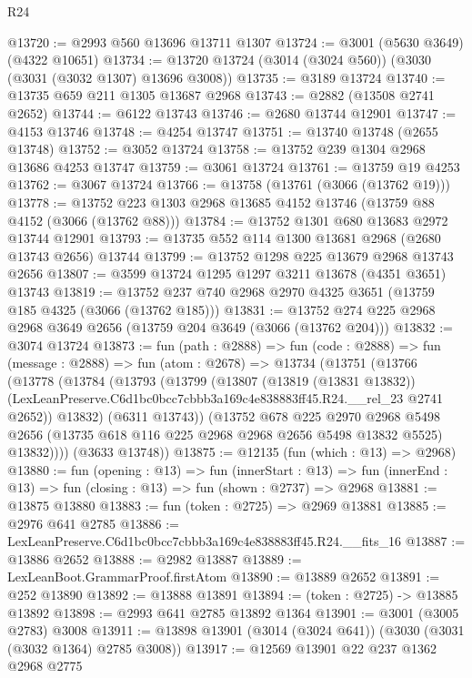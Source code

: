 \begin{lexlean}{R24}
\begin{coremodule}
@13720 := @2993 @560 @13696 @13711 @1307
@13724 := @3001 (@5630 @3649) (@4322 @10651)
@13734 := @13720 @13724 (@3014 (@3024 @560)) (@3030 (@3031 (@3032 @1307) @13696 @3008))
@13735 := @3189 @13724
@13740 := @13735 @659 @211 @1305 @13687 @2968
@13743 := @2882 (@13508 @2741 @2652)
@13744 := @6122 @13743
@13746 := @2680 @13744 @12901
@13747 := @4153 @13746
@13748 := @4254 @13747
@13751 := @13740 @13748 (@2655 @13748)
@13752 := @3052 @13724
@13758 := @13752 @239 @1304 @2968 @13686 @4253 @13747
@13759 := @3061 @13724
@13761 := @13759 @19 @4253
@13762 := @3067 @13724
@13766 := @13758 (@13761 (@3066 (@13762 @19)))
@13778 := @13752 @223 @1303 @2968 @13685 @4152 @13746 (@13759 @88 @4152 (@3066 (@13762 @88)))
@13784 := @13752 @1301 @680 @13683 @2972 @13744 @12901
@13793 := @13735 @552 @114 @1300 @13681 @2968 (@2680 @13743 @2656) @13744
@13799 := @13752 @1298 @225 @13679 @2968 @13743 @2656
@13807 := @3599 @13724 @1295 @1297 @3211 @13678 (@4351 @3651) @13743
@13819 := @13752 @237 @740 @2968 @2970 @4325 @3651 (@13759 @185 @4325 (@3066 (@13762 @185)))
@13831 := @13752 @274 @225 @2968 @2968 @3649 @2656 (@13759 @204 @3649 (@3066 (@13762 @204)))
@13832 := @3074 @13724
@13873 := fun (path : @2888) =>
  fun (code : @2888) =>
  fun (message : @2888) =>
  fun (atom : @2678) =>
  @13734
    (@13751
      (@13766
        (@13778
          (@13784
            (@13793
              (@13799
                (@13807
                  (@13819 (@13831 @13832))
                  (LexLeanPreserve.C6d1bc0bcc7cbbb3a169c4e838883ff45.R24.__rel_23 @2741 @2652))
                @13832)
              (@6311 @13743))
            (@13752
              @678
              @225
              @2970
              @2968
              @5498
              @2656
              (@13735 @618 @116 @225 @2968 @2968 @2656 @5498 @13832 @5525)
              @13832))))
      (@3633 @13748))
@13875 := @12135 (fun (which : @13) => @2968)
@13880 := fun (opening : @13) =>
  fun (innerStart : @13) =>
  fun (innerEnd : @13) => fun (closing : @13) => fun (shown : @2737) => @2968
@13881 := @13875 @13880
@13883 := fun (token : @2725) => @2969 @13881
@13885 := @2976 @641 @2785
@13886 := LexLeanPreserve.C6d1bc0bcc7cbbb3a169c4e838883ff45.R24.__fits_16
@13887 := @13886 @2652
@13888 := @2982 @13887
@13889 := LexLeanBoot.GrammarProof.firstAtom
@13890 := @13889 @2652
@13891 := @252 @13890
@13892 := @13888 @13891
@13894 := (token : @2725) -> @13885 @13892
@13898 := @2993 @641 @2785 @13892 @1364
@13901 := @3001 (@3005 @2783) @3008
@13911 := @13898 @13901 (@3014 (@3024 @641)) (@3030 (@3031 (@3032 @1364) @2785 @3008))
@13917 := @12569 @13901 @22 @237 @1362 @2968 @2775

\end{coremodule}
\end{lexlean}
